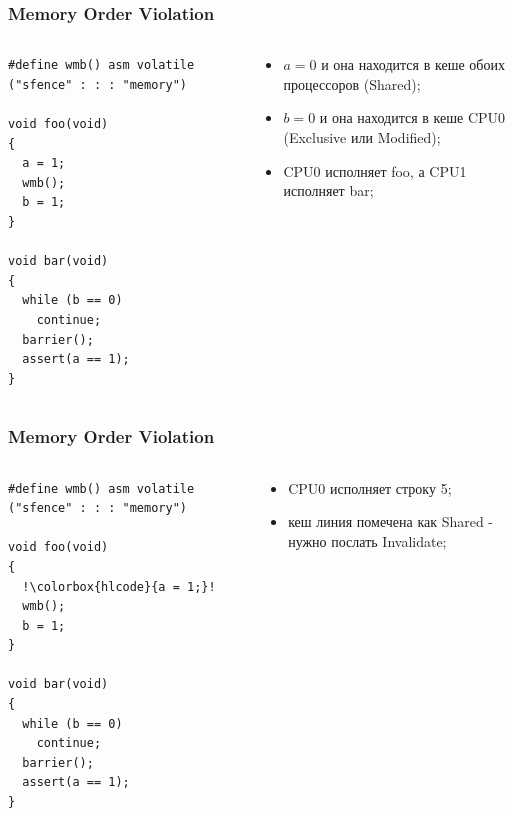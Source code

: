 \begin{frame}[fragile]
\frametitle{Memory Order Violation}

\begin{columns}[T]
  \begin{column}{.4\linewidth}
    \begin{lstlisting}[escapechar=!]
#define wmb() asm volatile ("sfence" : : : "memory")

void foo(void)
{
  a = 1;
  wmb();
  b = 1;
}

void bar(void)
{
  while (b == 0)
    continue;
  barrier();
  assert(a == 1);
}
    \end{lstlisting}
  \end{column}
  \begin{column}{.6\linewidth}
    \begin{itemize}
      \item $a = 0$ и она находится в кеше обоих процессоров (Shared);
      \item $b = 0$ и она находится в кеше CPU0 (Exclusive или Modified);
      \item CPU0 исполняет foo, а CPU1 исполняет bar;
    \end{itemize}
  \end{column}
\end{columns}
\end{frame}

\begin{frame}[fragile]
\frametitle{Memory Order Violation}

\begin{columns}[T]
  \begin{column}{.4\linewidth}
    \begin{lstlisting}[escapechar=!]
#define wmb() asm volatile ("sfence" : : : "memory")

void foo(void)
{
  !\colorbox{hlcode}{a = 1;}!
  wmb();
  b = 1;
}

void bar(void)
{
  while (b == 0)
    continue;
  barrier();
  assert(a == 1);
}
    \end{lstlisting}
  \end{column}
  \begin{column}{.6\linewidth}
    \begin{itemize}
      \item CPU0 исполняет строку 5;
      \item кеш линия помечена как Shared - нужно послать Invalidate;
    \end{itemize}
  \end{column}
\end{columns}
\end{frame}

